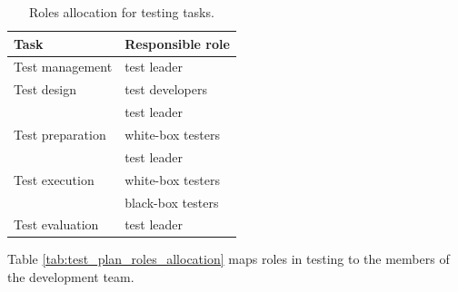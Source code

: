 \documentclass[11pt]{book}
\begin{document}
\begin{table}[H]
    \centering
    \begin{tabular}{| l | l |}
        \hline
        Task                & Responsible role              \\ \hline

        Test management     & test leader                   \\ \hline
        
        Test design         & test developers               \\
                            & test leader                   \\ \hline
        
        Test preparation    & white-box testers             \\
                            & test leader                   \\ \hline
        
        Test execution      & white-box testers             \\
                            & black-box testers             \\ \hline
        
        Test evaluation     & test leader                   \\ \hline
    \end{tabular}
    \caption{Roles allocation for testing tasks.}
    \label{tab:test_plan_tasks_allocation}
\end{table}

Table \ref{tab:test_plan_roles_allocation} maps roles in testing to the members of the development team.
\end{document}
